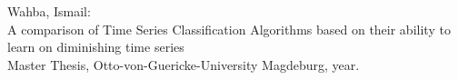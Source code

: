 \documentclass{article}
\begin{document}

\small
\vspace*{\fill}
{\raggedright
Wahba, Ismail:\\
A comparison of Time Series Classification Algorithms based on their
ability to learn on diminishing time series \\ Master Thesis, Otto-von-Guericke-University Magdeburg, year. 
}

\thispagestyle{empty}
\null\newpage

\null\newpage

\null\newpage


\end{document}
